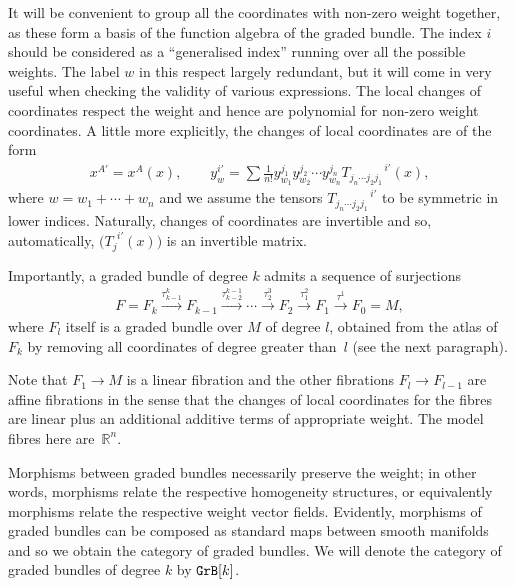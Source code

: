 \documentclass[10pt,a4paper]{amsart}
\newcommand{\catname}[1]{\textnormal{\texttt{#1}}}
\newcommand{\GrB}{\catname{GrB}}
\numberwithin{equation}{section}
\begin{document}
It will be convenient to group all the coordinates with non-zero weight together, as these form a basis of the function algebra of the graded bundle. The index $i$ should be considered as a ``generalised index'' running over all the possible weights. The label $w$ in this respect largely redundant, but it will come in very useful when checking the validity of various expressions. The local changes of coordinates respect the weight and hence are polynomial for non-zero weight coordinates. A little more explicitly, the changes of local coordinates are of the form
\begin{gather*}
 x^{A'} = x^{A}(x), \qquad y^{i'}_{w} = \sum \frac{1}{n!} y^{j_{1}}_{w_{1}} y^{j_{2}}_{w_{2}} \cdots y^{j_{n}}_{w_{n}}T_{j_{n} \cdots j_{2} j_{1}}^{\:\:\:\:\:\:\:\:\:\:\:\: \:\:\:\: i'}(x), \end{gather*}
where $w=w_1+\cdots+w_n$ and we assume the tensors $T_{j_{n} \cdots j_{2} j_{1}}^{\:\:\:\:\:\:\:\:\:\:\:\: \:\:\:\: i'}$ to be symmetric in lower indices. Naturally, changes of coordinates are invertible and so, automatically, $\big(T_{j}^{\:\: i'}(x)\big)$ is an invertible matrix.

Importantly, a graded bundle of degree $k$ admits a sequence of surjections
\begin{gather}\label{eqn:fibrations}
F=F_{k} \stackrel{\tau^{k}_{k-1}}{\longrightarrow} F_{k-1} \stackrel{\tau^{k-1}_{k-2}}{\longrightarrow} \cdots \stackrel{\tau^{3}_2}{\longrightarrow} F_{2} \stackrel{\tau^{2}_1}{\longrightarrow}F_{1} \stackrel{\tau^{1}}{\longrightarrow} F_{0} = M,
\end{gather}
where $F_l$ itself is a graded bundle over $M$ of degree $l$, obtained from the atlas of $F_k$ by removing all coordinates of degree greater than~$l$ (see the next paragraph).

Note that $F_{1} \rightarrow M$ is a linear f\/ibration and the other f\/ibrations $F_{l} \rightarrow F_{l-1}$ are af\/f\/ine f\/ibrations in the sense that the changes of local coordinates for the f\/ibres are linear plus an additional additive terms of appropriate weight. The model f\/ibres here are~$\mathbb{R}^{n}$.

Morphisms between graded bundles necessarily preserve the weight; in other words, morphisms relate the respective homogeneity structures, or equivalently morphisms relate the respective weight vector f\/ields. Evidently, morphisms of graded bundles can be composed as standard maps between smooth manifolds and so we obtain the category of graded bundles. We will denote the category of graded bundles of degree $k$ by $\GrB[k]$.
\end{document}
